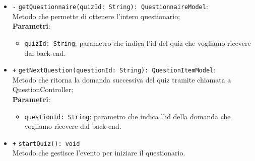\begin{itemize}
\begin{itemize}
\begin{itemize}
		\end{itemize}
		\item \texttt{-} \texttt{getQuestionnaire(quizId: String): QuestionnaireModel}: \\ Metodo che permette di ottenere l'intero questionario; \\
		\textbf{Parametri}:
		\begin{itemize}
			\item \texttt{quizId: String}: parametro che indica l'id del quiz che vogliamo ricevere dal back-end.
		\end{itemize}
		\item \texttt{+} \texttt{getNextQuestion(questionId: String): QuestionItemModel}: \\ Metodo che ritorna la domanda successiva del quiz tramite chiamata a QuestionController; \\
		\textbf{Parametri}:
		\begin{itemize}
			\item \texttt{questionId: String}: parametro che indica l'id della domanda che vogliamo ricevere dal back-end.
		\end{itemize}
		\item \texttt{+} \texttt{startQuiz(): void} \\
		Metodo che gestisce l'evento per iniziare il questionario. 
	\end{itemize}
\end{itemize}

